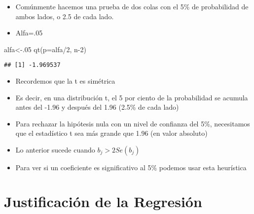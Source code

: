 \documentclass[
  ignorenonframetext,
]{beamer}
\newenvironment{Shaded}{\begin{snugshade}}{\end{snugshade}}
\newcommand{\AttributeTok}[1]{\textcolor[rgb]{0.77,0.63,0.00}{#1}}
\newcommand{\DecValTok}[1]{\textcolor[rgb]{0.00,0.00,0.81}{#1}}
\newcommand{\FunctionTok}[1]{\textcolor[rgb]{0.00,0.00,0.00}{#1}}
\newcommand{\NormalTok}[1]{#1}
\newcommand{\OtherTok}[1]{\textcolor[rgb]{0.56,0.35,0.01}{#1}}
\newcommand{\SpecialCharTok}[1]{\textcolor[rgb]{0.00,0.00,0.00}{#1}}
\providecommand{\tightlist}{%
  \setlength{\itemsep}{0pt}\setlength{\parskip}{0pt}}
\begin{document}
\begin{frame}[fragile]{}
\protect\hypertarget{section-20}{}
\begin{itemize}
\tightlist
\item
  Comúnmente hacemos una prueba de dos colas con el 5\% de probabilidad
  de ambos lados, o 2.5 de cada lado.
\item
  Alfa=.05
\end{itemize}

\begin{Shaded}
\begin{Highlighting}[]
\NormalTok{alfa}\OtherTok{\textless{}{-}}\NormalTok{.}\DecValTok{05}
\FunctionTok{qt}\NormalTok{(}\AttributeTok{p=}\NormalTok{alfa}\SpecialCharTok{/}\DecValTok{2}\NormalTok{, n}\DecValTok{{-}2}\NormalTok{)}
\end{Highlighting}
\end{Shaded}

\begin{verbatim}
## [1] -1.969537
\end{verbatim}

\begin{itemize}
\tightlist
\item
  Recordemos que la t es simétrica
\item
  Es decir, en una distribución t, el 5 por ciento de la probabilidad se
  acumula antes del -1.96 y después del 1.96 (2.5\% de cada lado)
\end{itemize}
\end{frame}

\begin{frame}{}
\protect\hypertarget{section-21}{}
\begin{itemize}
\tightlist
\item
  Para rechazar la hipótesis nula con un nivel de confianza del 5\%,
  necesitamos que el estadístico t sea más grande que 1.96 (en valor
  absoluto)
\item
  Lo anterior sucede cuando \(b_j > 2 Se (b_j)\)
\item
  Para ver si un coeficiente es significativo al 5\% podemos usar esta
  heurística
\end{itemize}
\end{frame}

\hypertarget{justificaciuxf3n-de-la-regresiuxf3n}{%
\section{Justificación de la
Regresión}\label{justificaciuxf3n-de-la-regresiuxf3n}}
\end{document}

